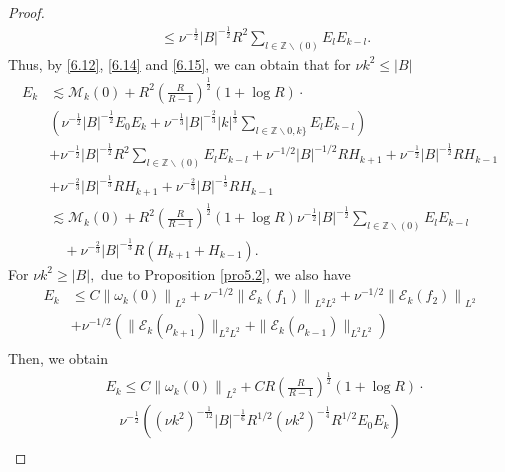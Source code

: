 \documentclass[final, 12pt,reqno]{amsart}
\numberwithin{equation}{section}
\begin{document}
\begin{proof}
\begin{equation}
\begin{aligned}
        &\leq \nu^{-\frac{1}{2}}|B|^{-\frac{1}{2}}R^2\sum_{l \in \mathbb{Z} \backslash(0)}E_lE_{k-l}.
\end{aligned}
\end{equation}
Thus, by \eqref{6.12}, \eqref{6.14} and \eqref{6.15}, we can obtain
that for $\nu k^2\leq |B|$
     \begin{equation}\label{6.16}
         \begin{aligned}
    E_k&\lesssim\mathcal{M}_k(0)+R^2\left(\frac{R}{R-1}\right)^{\frac{1}{2}}(1+\log R)\cdot\\
 &\left(\nu^{-\frac{1}{2}}|B|^{-\frac{1}{2}}E_0 E_k+\nu^{-\frac{1}{3}}|B|^{-\frac{2}{3}}|k|^{\frac{1}{3}}\sum_{l \in \mathbb{Z} \backslash 0, k\}} E_l E_{k-l}\right)\\
 &+\nu^{-\frac{1}{2}}|B|^{-\frac{1}{2}}R^2\sum_{l \in \mathbb{Z} \backslash(0)}E_lE_{k-l}+\nu^{-1/2}|B|^{-1/2}RH_{k+1}+\nu^{-\frac{1}{2}}|B|^{-\frac{1}{2}}RH_{k-1}\\
 &+\nu^{-\frac{2}{3}}|B|^{-\frac{1}{3}}RH_{k+1}+\nu^{-\frac{2}{3}}|B|^{-\frac{1}{3}}RH_{k-1}\\
 &\lesssim \mathcal{M}_k(0)+R^2\left(\frac{R}{R-1}\right)^{\frac{1}{2}}(1+\log R)\nu^{-\frac{1}{2}}|B|^{-\frac{1}{2}}\sum_{l \in \mathbb{Z} \backslash(0)}E_lE_{k-l}\\
 &\quad+\nu^{-\frac{2}{3}}|B|^{-\frac{1}{3}}R(H_{k+1}+H_{k-1}).
\end{aligned}
\end{equation}\label{6.17}
    For $\nu k^2\geq |B|,$ due to Proposition \ref{pro5.2}, we also have
 \begin{equation}\label{6.17}
        \begin{aligned}
            E_k&\leq C\left\|\omega_k(0)\right\|_{L^2}+\nu^{-1/2}\left\|\mathcal{E}_k(f_1)\right\|_{L^2 L^2}
        +\nu^{-1/2}\left\|\mathcal{E}_k(f_2)\right\|_{L^2}\\
   &+\nu^{-1/2}(\|\mathcal{E}_k(\rho_{k+1})\|_{L^2L^2}+\|\mathcal{E}_k(\rho_{k-1})\|_{L^2L^2})\\
  \end{aligned}
  \end{equation}
  Then, we obtain
  \begin{equation}
\begin{aligned}
 &E_k \leq C\left\|\omega_k(0)\right\|_{L^2}+C R\left(\frac{R}{R-1}\right)^{\frac{1}{2}}(1+\log R)\cdot\\
   &\quad\nu^{-\frac{1}{2}}\left( \left(\nu k^2\right)^{-\frac{1}{12}}|B|^{-\frac{1}{6}} R^{1/2} (\nu k^2)^{-\frac{1}{4}}R^{1/2}E_0 E_k\right)\\

\end{aligned}
\end{equation}
\end{proof}
\end{document}
